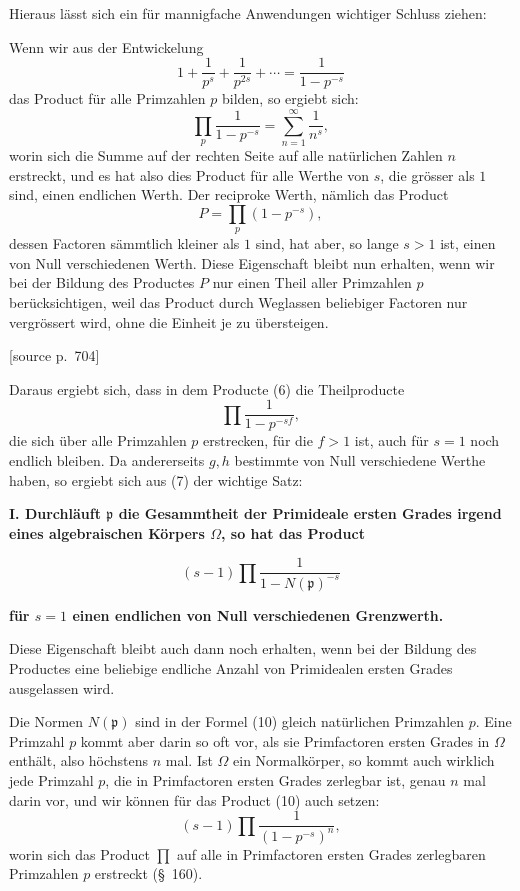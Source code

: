 \documentclass[11pt]{article}
\newcommand{\srcpage}[1]{\par\medskip\noindent\textsf{[source p.~#1]}\par\smallskip}
\begin{document}
Hieraus lässt sich ein für mannigfache Anwendungen wichtiger Schluss ziehen:

Wenn wir aus der Entwickelung
\[
1+\frac1{p^s}+\frac1{p^{2s}}+\cdots=\frac1{1-p^{-s}}
\]
das Product für alle Primzahlen $p$ bilden, so ergiebt sich:
\begin{equation}
\prod_p\frac1{1-p^{-s}}=\sum_{n=1}^{\infty}\frac1{n^s},
\tag{8}
\end{equation}
worin sich die Summe auf der rechten Seite auf alle natürlichen Zahlen $n$ erstreckt, und es hat also dies Product für alle Werthe von $s$, die grösser als $1$ sind, einen endlichen Werth. Der reciproke Werth, nämlich das Product
\begin{equation}
P=\prod_p(1-p^{-s}),
\tag{9}
\end{equation}
dessen Factoren sämmtlich kleiner als $1$ sind, hat aber, so lange $s>1$ ist, einen von Null verschiedenen Werth. Diese Eigenschaft bleibt nun erhalten, wenn wir bei der Bildung des Productes $P$ nur einen Theil aller Primzahlen $p$ berücksichtigen, weil das Product durch Weglassen beliebiger Factoren nur vergrössert wird, ohne die Einheit je zu übersteigen.

\srcpage{704}
Daraus ergiebt sich, dass in dem Producte (6) die Theilproducte
\[
\prod\frac1{1-p^{-sf}},
\]
die sich über alle Primzahlen $p$ erstrecken, für die $f>1$ ist, auch für $s=1$ noch endlich bleiben. Da andererseits $g,h$ bestimmte von Null verschiedene Werthe haben, so ergiebt sich aus (7) der wichtige Satz:

\begin{center}
\textbf{I. Durchläuft $\mathfrak p$ die Gesammtheit der Primideale ersten Grades irgend eines algebraischen Körpers $\Omega$, so hat das Product}
\end{center}
\begin{equation}
(s-1)\prod\frac1{1-N(\mathfrak p)^{-s}}
\tag{10}
\end{equation}
\begin{center}
\textbf{für $s=1$ einen endlichen von Null verschiedenen Grenzwerth.}
\end{center}

Diese Eigenschaft bleibt auch dann noch erhalten, wenn bei der Bildung des Productes eine beliebige endliche Anzahl von Primidealen ersten Grades ausgelassen wird.

Die Normen $N(\mathfrak p)$ sind in der Formel (10) gleich natürlichen Primzahlen $p$. Eine Primzahl $p$ kommt aber darin so oft vor, als sie Primfactoren ersten Grades in $\Omega$ enthält, also höchstens $n$ mal. Ist $\Omega$ ein Normalkörper, so kommt auch wirklich jede Primzahl $p$, die in Primfactoren ersten Grades zerlegbar ist, genau $n$ mal darin vor, und wir können für das Product (10) auch setzen:
\[
(s-1)\prod\frac1{(1-p^{-s})^n},
\]
worin sich das Product $\prod$ auf alle in Primfactoren ersten Grades zerlegbaren Primzahlen $p$ erstreckt (\S~160).
\end{document}

